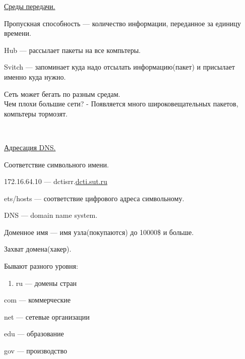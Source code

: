 \par 
\\

\par 
\\

\par 
\\

\par 
\\

\par 
\\

\par 
\underline{Среды передачи.}
\par 
Пропускная способность —
количество информации, переданное за
единицу времени.
\par 
Hub — рассылает пакеты на все
компьтеры.
\par 
Svitch — запоминает куда надо
отсылать информацию(пакет) и присылает
именно куда нужно.
\par 
Сеть может бегать по разным
средам.\\Чем плохи большие сети? -
Появляется много широковещательных
пакетов, компьтеры тормозят.
\par 
\\

\par 
\underline{Адресация DNS.}
\par 
Соответствие символьного имени.
\par 172.16.64.10
— dctisrr.\underline{dcti.sut.ru}
\par 
ets/hosts — соответствие цифрового
адреса символьному.
\par 
DNS — domain name system.
\par 
Доменное имя — имя узла(покупаются)
до 10000\$ и больше.
\par 
Захват домена(хакер).
\par 
Бывают разного уровня:
\begin{enumerate}
	\item \par 
	ru — домены стран
\end{enumerate}
\par 
com — коммерческие
\par 
net — сетевые организации
\par 
edu — образование 

\par 
gov — производство 

